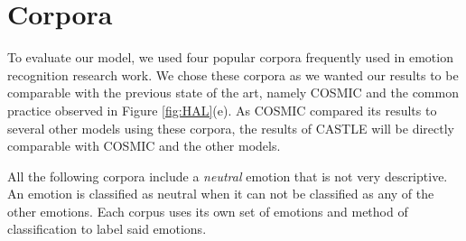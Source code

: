 \documentclass[nofilelist]{cslthse-msc}
\begin{document}


\section{Corpora}

To evaluate our model, we used four popular corpora frequently used in emotion recognition research work. We chose these corpora as we wanted our results to be comparable with the previous state of the art, namely COSMIC and the common practice observed in Figure \ref{fig:HAL}(e). As COSMIC compared its results to several other models using these corpora, the results of CASTLE will be directly comparable with COSMIC and the other models. 

All the following corpora include a \textit{neutral} emotion that is not very descriptive. An emotion is classified as neutral when it can not be classified as any of the other emotions. Each corpus uses its own set of emotions and method of classification to label said emotions. 


\end{document}
